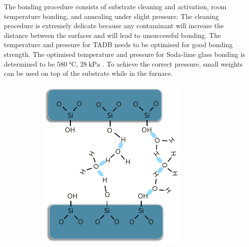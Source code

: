 \documentclass[final]{jyflluk}
\begin{document}
The bonding procedure consists of substrate cleaning and activation, room temperature bonding, and annealing under slight pressure. The cleaning procedure is extremely delicate because any contaminant will increase the distance between the surfaces and will lead to unsuccessful bonding. The temperature and pressure for TADB needs to be optimised for good bonding strength. The optimised temperature and pressure for Soda-lime glass bonding is determined to be $\SI{580}{\celsius}$, $\SI{28}{\kilo \pascal}$ \cite{chen2009thermal}. To achieve the correct pressure, small weights can be used on top of the substrate while in the furnace.


\begin{figure}[h]
    \centering
    \begin{subfigure}[ht]{0.3\textwidth}
        \centering
        \includegraphics[width=\linewidth]{images/TDAB3.pdf} 
        \caption{} \label{fig:dessdfsdfisdfsdfgn1}
    \end{subfigure}
    \hfill
    \begin{subfigure}[ht]{0.3\textwidth}
        \centering

\end{subfigure}
\end{figure}
\end{document}
